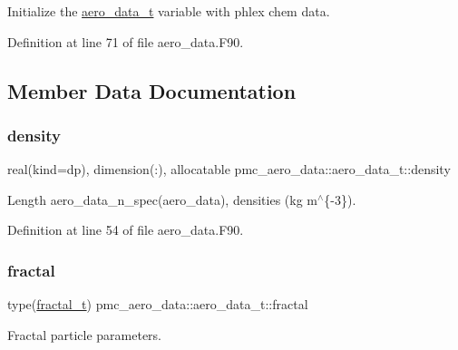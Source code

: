 Initialize the \mbox{\hyperlink{structpmc__aero__data_1_1aero__data__t}{aero\+\_\+data\+\_\+t}} variable with phlex chem data. 



Definition at line 71 of file aero\+\_\+data.\+F90.



\subsection{Member Data Documentation}
\mbox{\label{structpmc__aero__data_1_1aero__data__t_a727518f99245c84dd49d6ea8debe16d1}} 
\subsubsection{\texorpdfstring{density}{density}}
{\footnotesize\ttfamily real(kind=dp), dimension(\+:), allocatable pmc\+\_\+aero\+\_\+data\+::aero\+\_\+data\+\_\+t\+::density}



Length {\ttfamily aero\+\_\+data\+\_\+n\+\_\+spec(aero\+\_\+data)}, densities (kg m$^\wedge$\{-\/3\}). 



Definition at line 54 of file aero\+\_\+data.\+F90.

\mbox{\label{structpmc__aero__data_1_1aero__data__t_a74d88532c928f879e1e968499fb6e5fa}} 
\subsubsection{\texorpdfstring{fractal}{fractal}}
{\footnotesize\ttfamily type(\mbox{\hyperlink{structpmc__fractal_1_1fractal__t}{fractal\+\_\+t}}) pmc\+\_\+aero\+\_\+data\+::aero\+\_\+data\+\_\+t\+::fractal}



Fractal particle parameters. 



